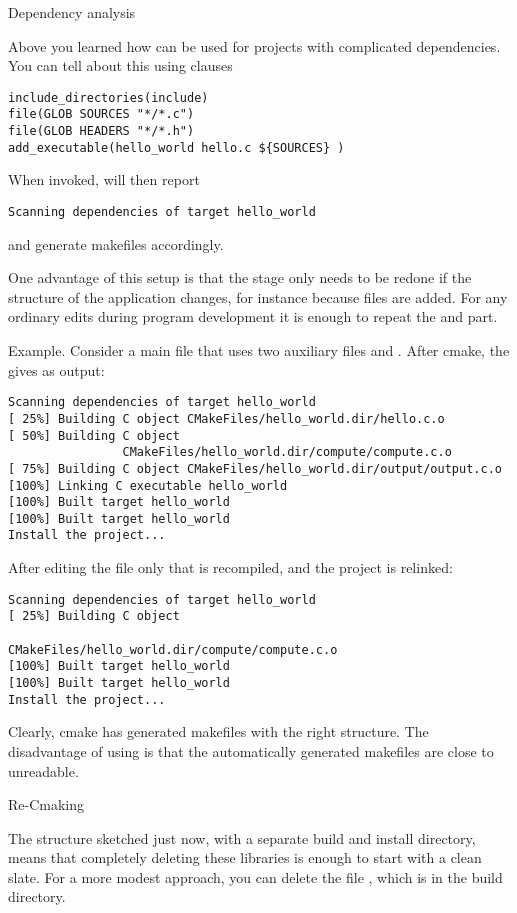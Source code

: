  {Dependency analysis}

Above you learned how  can be used for projects with
complicated dependencies. You can tell  about this using
clauses
\begin{lstlisting}
include_directories(include)
file(GLOB SOURCES "*/*.c")
file(GLOB HEADERS "*/*.h")
add_executable(hello_world hello.c ${SOURCES} )
\end{lstlisting}
When invoked,  will then report
\begin{lstlisting}
Scanning dependencies of target hello_world
\end{lstlisting}
and generate makefiles accordingly.

One advantage of this setup is that the  stage only needs to
be redone if the structure of the application changes, for instance
because files are added. For any ordinary edits during program
development it is enough to repeat the  and 
part.

Example. Consider a main file  that uses two auxiliary
files  and . After cmake, the  gives as output:
\begin{lstlisting}
Scanning dependencies of target hello_world
[ 25%] Building C object CMakeFiles/hello_world.dir/hello.c.o
[ 50%] Building C object
                CMakeFiles/hello_world.dir/compute/compute.c.o
[ 75%] Building C object CMakeFiles/hello_world.dir/output/output.c.o
[100%] Linking C executable hello_world
[100%] Built target hello_world
[100%] Built target hello_world
Install the project...
\end{lstlisting}
After editing the  file only that is recompiled, and the
project is relinked:
\begin{lstlisting}
Scanning dependencies of target hello_world
[ 25%] Building C object
                
CMakeFiles/hello_world.dir/compute/compute.c.o
[100%] Built target hello_world
[100%] Built target hello_world
Install the project...
\end{lstlisting}
Clearly, cmake has generated makefiles with the right structure.
The disadvantage of using  is that the automatically
generated makefiles are close to unreadable.

 {Re-Cmaking}

The structure sketched just now, with a separate build and install
directory, means that completely deleting these libraries is enough to
start with a clean slate. For a more modest approach, you can delete
the file , which is in the build directory.

